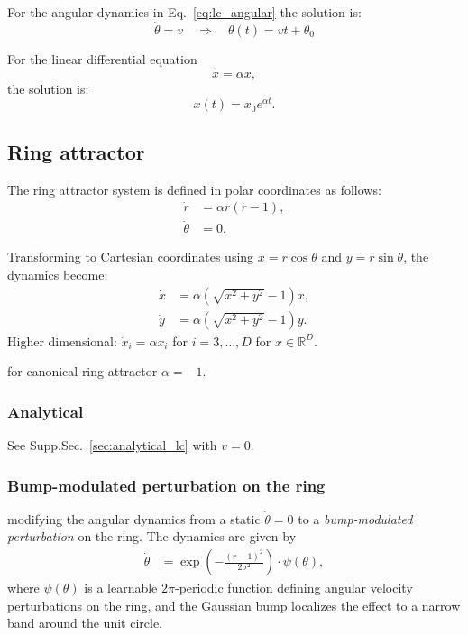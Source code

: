 \documentclass{article}
\theoremstyle{definition} \newtheorem{definition}{Definition}  \newtheorem{example}{Example}
\theoremstyle{remark} \newtheorem{remark}{Remark}
\newcounter{ct}
\newcommand{\field}[1]{\ensuremath{\mathbb{#1}}}
\newcommand{\reals}{\field{R}}
\begin{document}
For the angular dynamics  in Eq.~\ref{eq:lc_angular} the solution is:
\[
\dot{\theta} = v
\quad \Rightarrow \quad 
\theta(t) = vt + \theta_0
\]

For the linear differential equation
\[
\dot{x} = \alpha x,
\]
the solution is:
\[
x(t) = x_0 e^{\alpha t}.
\]


\subsection{Ring attractor}\label{sec:ra}
The ring attractor system is defined in polar coordinates as follows:
\begin{equation}\label{eq:ra}
\begin{aligned}
\dot{r} &= \alpha r(r - 1), \\
\dot{\theta} &= 0.
\end{aligned}
\end{equation}

Transforming to Cartesian coordinates using \( x = r \cos\theta \) and \( y = r \sin\theta \), the dynamics become:
\[
\begin{aligned}
\dot{x} &= \alpha\left( \sqrt{x^2 + y^2} - 1 \right) x, \\
\dot{y} &= \alpha\left( \sqrt{x^2 + y^2} - 1 \right) y.
\end{aligned}
\]
Higher dimensional: $\dot x_i = \alpha x_i$ for $i=3, \dots, D$ for $x\in \reals^D$.

for canonical ring attractor $\alpha=-1$.


\subsubsection{Analytical}
See Supp.Sec.~\ref{sec:analytical_lc} with $v=0$.


\subsubsection{Bump-modulated perturbation on the ring}
modifying the angular dynamics from a static $\dot\theta=0$ to a \emph{bump-modulated perturbation} on the ring.
The dynamics are given by
\begin{align}
\dot{\theta} &= \exp\left(-\frac{(r - 1)^2}{2\sigma^2} \right) \cdot \psi(\theta), \label{eq:bumpmod_angular}
\end{align}
where \( \psi(\theta) \) is a learnable \( 2\pi \)-periodic function defining angular velocity perturbations on the ring, and the Gaussian bump localizes the effect to a narrow band around the unit circle.
\end{document}
